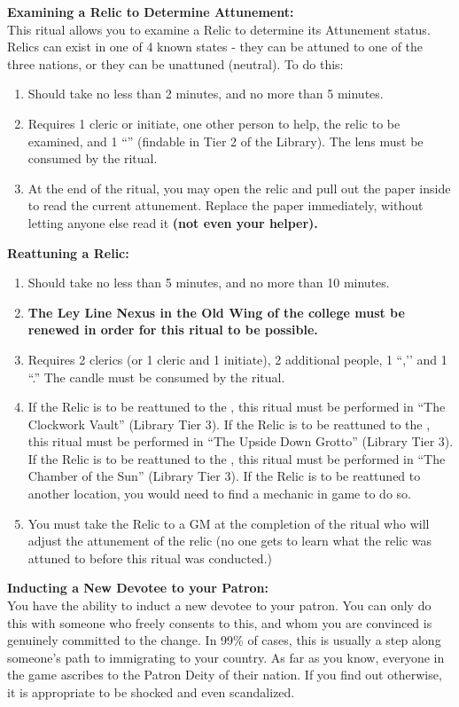 \documentclass[green]{GL2020}
\begin{document}
\textbf{Examining a Relic to Determine Attunement:}\\
This ritual allows you to examine a Relic to determine its Attunement status. Relics can exist in one of 4 known states - they can be attuned to one of the three nations, or they can be unattuned (neutral). To do this:
  \begin{enumerate}
    \item Should take no less than 2 minutes, and no more than 5 minutes.
    \item Requires 1 cleric or initiate, one other person to help, the relic to be examined, and 1 ``\iCrystalLens{}'' (findable in Tier 2 of the Library). The lens must be consumed by the ritual. 
    \item At the end of the ritual, you may open the relic and pull out the paper inside to read the current attunement. Replace the paper immediately, without letting anyone else read it \textbf{(not even your helper).}
  \end{enumerate}
   
\textbf{Reattuning a Relic:}

 \begin{enumerate}
    \item Should take no less than 5 minutes, and no more than 10 minutes.
    \item \textbf{The Ley Line Nexus in the Old Wing of the college must be renewed in order for this ritual to be possible.}
    \item Requires 2 clerics (or 1 cleric and 1 initiate), 2 additional people, 1 ``\iRitualCandle{},’’ and 1 ``\iTuningFork{}.'' The candle must be consumed by the ritual.
    \item If the Relic is to be reattuned to the \pTech{}, this ritual must be performed in “The Clockwork Vault” (Library Tier 3). If the Relic is to be reattuned to the \pShip{}, this ritual must be performed in “The Upside Down Grotto” (Library Tier 3). If the Relic is to be reattuned to the \pFarm{}, this ritual must be performed in “The Chamber of the Sun” (Library Tier 3). If the Relic is to be reattuned to another location, you would need to find a mechanic in game to do so.
    \item You must take the Relic to a GM at the completion of the ritual who will adjust the attunement of the relic (no one gets to learn what the relic was attuned to before this ritual was conducted.)
  \end{enumerate}
   
\textbf{Inducting a New Devotee to your Patron:}\\
You have the ability to induct a new devotee to your patron. You can only do this with someone who freely consents to this, and whom you are convinced is genuinely committed to the change. In 99\% of cases, this is usually a step along someone’s path to immigrating to your country. As far as you know, everyone in the game ascribes to the Patron Deity of their nation. If you find out otherwise, it is appropriate to be shocked and even scandalized. 
\end{document}
